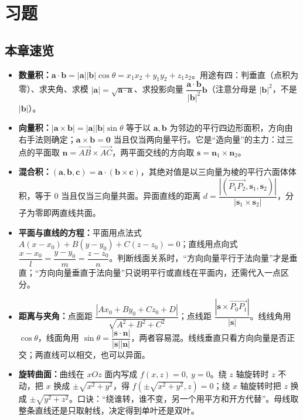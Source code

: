 \section{习题}

\subsection{本章速览}

\begin{itemize}
\item \textbf{数量积：}$\mathbf a\cdot\mathbf b=|\mathbf a||\mathbf b|\cos\theta=x_1x_2+y_1y_2+z_1z_2$。用途有四：判垂直（点积为零）、求夹角、求模 $|\mathbf a|=\sqrt{\mathbf a\cdot\mathbf a}$、求投影向量 $\dfrac{\mathbf a\cdot\mathbf b}{|\mathbf b|^2}\mathbf b$（注意分母是 $|\mathbf b|^2$，不是 $|\mathbf b|$）。
\item \textbf{向量积：}$|\mathbf a\times\mathbf b|=|\mathbf a||\mathbf b|\sin\theta$ 等于以 $\mathbf a,\mathbf b$ 为邻边的平行四边形面积，方向由右手法则确定；$\mathbf a\times\mathbf b=\mathbf 0$ 当且仅当两向量平行。它是“造向量”的主力：过三点的平面取 $\mathbf n=\overrightarrow{AB}\times\overrightarrow{AC}$，两平面交线的方向取 $\mathbf s=\mathbf n_1\times\mathbf n_2$。
\item \textbf{混合积：}$(\mathbf a,\mathbf b,\mathbf c)=\mathbf a\cdot(\mathbf b\times\mathbf c)$，其绝对值是以三向量为棱的平行六面体体积，等于 $0$ 当且仅当三向量共面。异面直线的距离 $d=\dfrac{|(\overrightarrow{P_1P_2},\mathbf s_1,\mathbf s_2)|}{|\mathbf s_1\times\mathbf s_2|}$，分子为零即两直线共面。
\item \textbf{平面与直线的方程：}平面用点法式 $A(x-x_0)+B(y-y_0)+C(z-z_0)=0$；直线用点向式 $\dfrac{x-x_0}{l}=\dfrac{y-y_0}{m}=\dfrac{z-z_0}{n}$。判断线面关系时，“方向向量平行于法向量”才是垂直；“方向向量垂直于法向量”只说明平行或直线在平面内，还需代入一点区分。
\item \textbf{距离与夹角：}点面距 $\dfrac{|Ax_0+By_0+Cz_0+D|}{\sqrt{A^2+B^2+C^2}}$；点线距 $\dfrac{|\mathbf s\times\overrightarrow{P_0P_1}|}{|\mathbf s|}$。线线角用 $\cos\theta$，线面角用 $\sin\theta=\dfrac{|\mathbf s\cdot\mathbf n|}{|\mathbf s||\mathbf n|}$，两者容易混。线线垂直只看方向向量是否正交；两直线可以相交，也可以异面。
\item \textbf{旋转曲面：}曲线在 $xOz$ 面内写成 $f(x,z)=0,\ y=0$。绕 $z$ 轴旋转时 $z$ 不动，把 $x$ 换成 $\pm\sqrt{x^2+y^2}$，得 $f(\pm\sqrt{x^2+y^2},z)=0$；绕 $x$ 轴旋转时把 $z$ 换成 $\pm\sqrt{y^2+z^2}$。口诀：“绕谁转，谁不变，另一个用平方和开方代替”。母线取整条直线还是只取射线，决定得到单叶还是双叶。
\end{itemize}

